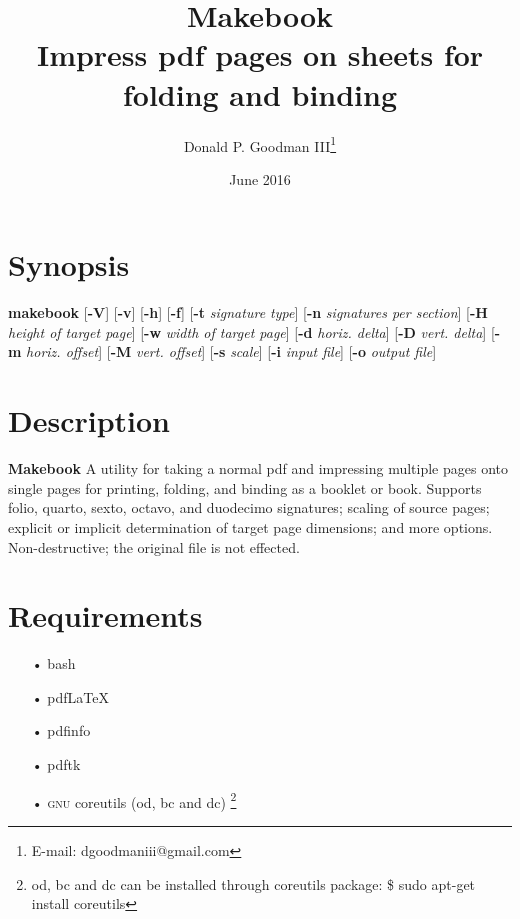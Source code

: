 \documentclass[12pt,twoside,final]{extarticle}
\author{Donald P. Goodman III\footnote{E-mail: dgoodmaniii@gmail.com}}
\title{Makebook \\ Impress pdf pages on sheets for folding and binding}
\date{June 2016}
\let\oldfootnote\footnote
\renewcommand\footnote[1]{%
\oldfootnote{\hspace{1mm}#1}}
\begin{document}
\maketitle
\parindent=5mm
\parskip=0mm
\pagestyle{fancy}
\fancyhf{}
\fancyfoot[CO,CE]{\thepage}
\renewcommand{\headrulewidth}{0pt}
\section{Synopsis}
\textbf{makebook} [\textbf{-V}] [\textbf{-v}] [\textbf{-h}] [\textbf{-f}] [\textbf{-t} \emph{signature type}] [\textbf{-n} \emph{signatures per section}] [\textbf{-H} \emph{height of target page}] [\textbf{-w} \emph{width of target page}] [\textbf{-d} \emph{horiz. delta}] [\textbf{-D} \emph{vert. delta}] [\textbf{-m} \emph{horiz. offset}] [\textbf{-M} \emph{vert. offset}] [\textbf{-s} \emph{scale}] [\textbf{-i} \emph{input file}] [\textbf{-o} \emph{output file}]
\section{Description}
\textbf{Makebook} A utility for taking a normal pdf and impressing multiple pages onto single pages for printing, folding, and binding as a booklet or book. Supports folio, quarto, sexto, octavo, and duodecimo signatures; scaling of source pages; explicit or implicit determination of target page dimensions; and more options. Non-destructive; the original file is not effected.
\section{Requirements}
\begin{itemize}[noitemsep]
\item[•]bash
\item[•]pdfLaTeX
\item[•]pdfinfo
\item[•]pdftk
\item[•]\textsc{gnu} coreutils (od, bc and dc)\footnote{od, bc and dc can be installed through coreutils package: \$ sudo apt-get install coreutils}
\end{itemize}
\end{document}
